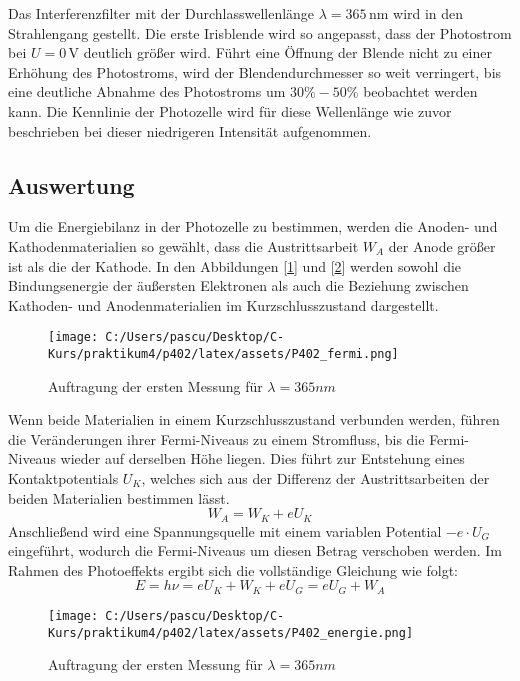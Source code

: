 \documentclass{article}
\begin{document}
Das Interferenzfilter mit der Durchlasswellenlänge $\lambda = 365\,\mathrm{nm}$ wird in den 
Strahlengang gestellt. Die erste Irisblende wird so angepasst, dass der Photostrom bei 
$U = 0\,\mathrm{V}$ deutlich größer wird. Führt eine Öffnung der Blende nicht zu einer 
Erhöhung des Photostroms, wird der Blendendurchmesser so weit verringert, bis eine deutliche 
Abnahme des Photostroms um $30\%-50\%$ beobachtet werden kann. Die Kennlinie der Photozelle 
wird für diese Wellenlänge wie zuvor beschrieben bei dieser niedrigeren Intensität aufgenommen.

\subsection{Auswertung}
Um die Energiebilanz in der Photozelle zu bestimmen, werden die Anoden- und Kathodenmaterialien 
so gewählt, dass die Austrittsarbeit \( W_A \) der Anode größer ist als die der Kathode. 
In den Abbildungen [\ref{fig:fermi}] und [\ref{fig:energie}] werden sowohl die Bindungsenergie 
der äußersten Elektronen als auch die Beziehung zwischen Kathoden- und Anodenmaterialien im 
Kurzschlusszustand dargestellt.
\begin{figure}[h!]
  \centering
  \texttt{[image: C:/Users/pascu/Desktop/C-Kurs/praktikum4/p402/latex/assets/P402\_fermi.png]}
  \caption{Auftragung der ersten Messung für $ \lambda =365nm$}
  \label{fig:fermi}
\end{figure}
Wenn beide Materialien in einem Kurzschlusszustand verbunden werden, führen die 
Veränderungen ihrer Fermi-Niveaus zu einem Stromfluss, bis die Fermi-Niveaus wieder 
auf derselben Höhe liegen. Dies führt zur Entstehung eines Kontaktpotentials \( U_K \),
 welches sich aus der Differenz der Austrittsarbeiten der beiden Materialien bestimmen lässt.
\[
W_A = W_K + eU_K
\]
Anschließend wird eine Spannungsquelle mit einem variablen Potential
 \( -e \cdot U_G \) eingeführt, wodurch die Fermi-Niveaus um diesen Betrag verschoben werden.
Im Rahmen des Photoeffekts ergibt sich die vollständige Gleichung wie folgt:
\begin{equation}
  E = h \nu = e U_{K} + W_K + e U_G = e U_G + W_A
\end{equation}
\begin{figure}[h!]
  \centering
  \texttt{[image: C:/Users/pascu/Desktop/C-Kurs/praktikum4/p402/latex/assets/P402\_energie.png]}
  \caption{Auftragung der ersten Messung für $ \lambda =365nm$}
  \label{fig:energie}
\end{figure}
\newpage
\end{document}
